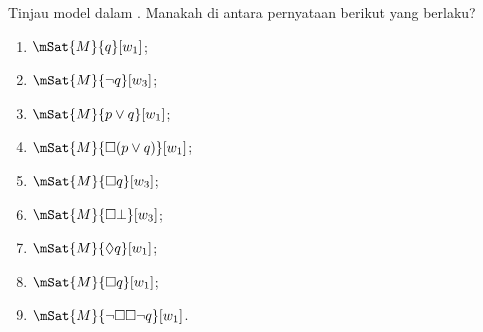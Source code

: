\documentclass[../../../include/open-logic-section]{subfiles}
\begin{document}
\begin{prob}
  Tinjau model dalam . Manakah di antara
  pernyataan berikut yang berlaku?
    \begin{enumerate}
    \item $\mSat{M}{q}[w_1]$;
    \item $\mSat{M}{\lnot q}[w_3]$;
    \item $\mSat{M}{p \lor q}[w_1]$;
    \item $\mSat{M}{\Box (p \lor q)}[w_1]$;
    \item $\mSat{M}{\Box q}[w_3]$;
    \item $\mSat{M}{\Box \bot}[w_3]$;
    \item $\mSat{M}{\Diamond q}[w_1]$;
    \item $\mSat{M}{\Box q}[w_1]$;
    \item $\mSat{M}{\lnot \Box\Box \lnot q}[w_1]$.
    \end{enumerate}
\end{prob}
\end{document}
